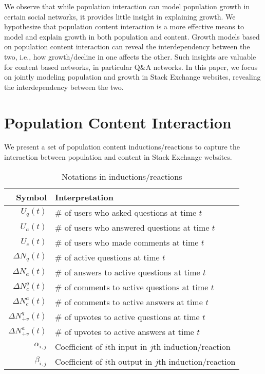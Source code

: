 We observe that while population interaction can model population growth in certain social networks, it provides little insight in explaining growth. 
We hypothesize that population content interaction is a more effective means to model and explain growth in both population and content. Growth models based on population content interaction can reveal the interdependency between the two, i.e., how growth/decline in one affects the other. Such insights are valuable for content based networks, in particular Q\&A networks. In this paper, we focus on jointly modeling population and growth in Stack Exchange websites, revealing the interdependency between the two.

\section{Population Content Interaction}
We present a set of population content inductions/reactions  to capture the interaction between population and content in Stack Exchange websites.  %


\begin{table}[hbt]
	\centering
	\begin{tabular}{rl}
	\toprule
	\textbf{Symbol} & \textbf{Interpretation}\\ \midrule
	$U_q(t)$ & \# of users who asked questions at time $t$\\
	$U_a(t)$ & \# of users who answered questions at time $t$\\
	$U_c(t)$ & \# of users who made comments at time $t$\\
	$\Delta N_q(t)$ & \# of active questions at time $t$\\
	$\Delta N_a(t)$ & \# of answers to active questions at time $t$\\
	$\Delta N_c^q(t)$ & \# of comments to active questions at time $t$\\
	$\Delta N_c^a(t)$ & \# of comments to active answers at time $t$\\
	$\Delta N_{+v}^q(t)$ & \# of upvotes to active questions at time $t$\\
	$\Delta N_{+v}^a(t)$ & \# of upvotes to active answers at time $t$\\
	$\alpha_{i, j}$ & Coefficient of $i$th input in $j$th induction/reaction\\
	$\beta_{i, j}$ & Coefficient of $i$th output in $j$th induction/reaction\\ \bottomrule
	 \end{tabular}
    \caption{Notations in inductions/reactions}
\end{table}

